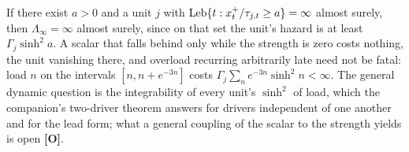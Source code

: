 \begin{corollary}
\label{gr1:cor:recurrentanatomy}
If there exist $a>0$ and a unit $j$ with
$\operatorname{Leb}\{t:x_t^+/\tau_{j,t}\ge a\}=\infty$ almost surely, then
$\Lambda_\infty=\infty$ almost surely, since on that set the unit's hazard
is at least $\Gamma_j\sinh^2a$. A scalar that falls behind only while the
strength is zero costs nothing, the unit vanishing there, and overload
recurring arbitrarily late need not be fatal: load $n$ on the intervals
$[n,n+e^{-3n}]$ costs $\Gamma_j\sum_ne^{-3n}\sinh^2n<\infty$. The general
dynamic question is the integrability of every unit's $\sinh^2$ of load,
which the companion's two-driver theorem answers for drivers independent
of one another and for the lead form; what a general coupling of the
scalar to the strength yields is open \textbf{[O]}.
\end{corollary}

